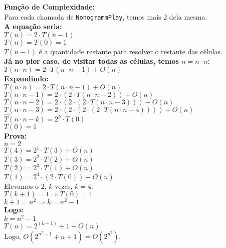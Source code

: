 \documentclass{article}
\begin{document}
\begin{center}
   \textbf{Função de Complexidade:}\\[1em]
   Para cada chamada de \texttt{NonogrammPlay}, temos mais 2 dela mesma.\\[1em]

   \textbf{A equação seria:}\\[1em]
   \( T(n) = 2 \cdot T(n-1) \)\\
   \( T(n) = T(0) = 1 \)\\[1em]
   \( T(n-1) \) é a quantidade restante para resolver o restante das células.\\[2em]

   \textbf{Já no pior caso, de visitar todas as células, temos \( n = n \cdot n \):}\\
   \( T(n \cdot n) = 2 \cdot T(n \cdot n - 1) + O(n) \)\\[1em]

   \textbf{Expandindo:}\\[1em]
   \( T(n \cdot n) = 2 \cdot T(n \cdot n - 1) + O(n) \)\\
   \( T(n \cdot n - 1) = 2 \cdot (2 \cdot T(n \cdot n - 2)) + O(n) \)\\
   \( T(n \cdot n - 2) = 2 \cdot (2 \cdot (2 \cdot T(n \cdot n - 3))) + O(n) \)\\
   \( T(n \cdot n - 3) = 2 \cdot (2 \cdot (2 \cdot (2 \cdot T(n \cdot n - 4)))) + O(n) \)\\[1em]
   \(\ldots\)\\
   \( T(n \cdot n - k) = 2^k \cdot T(0) \)\\[1em]
   \( T(0) = 1 \)\\[2em]

   \textbf{Prova:}\\[1em]
   \( n = 2 \)\\[2em]

 
   \( T(4) = 2^1 \cdot T(3) + O(n) \)\\
   \( T(3) = 2^2 \cdot T(2) + O(n) \)\\
   \( T(2) = 2^3 \cdot T(1) + O(n) \)\\
   \( T(1) = 2^4 \cdot (2 \cdot T(0)) + O(n) \)\\[2em]
  

   Elevamos o 2, \( k \) vezes, \( k = 4 \).\\[1em]
   \( T(k+1) = 1 \Rightarrow T(0) = 1 \)\\
   \( k + 1 = n^2 \Rightarrow k = n^2 - 1 \)\\[2em]

   \textbf{Logo:}\\[1em]
   \( k = n^2 - 1 \)\\
   \( T(n) = 2^{(k - 1)} + 1 + O(n) \)\\[1em]
   \( \text{Logo, } O(2^{n^2 - 1} + n + 1) = O(2^{n^2}) \).
\end{center}
\end{document}
